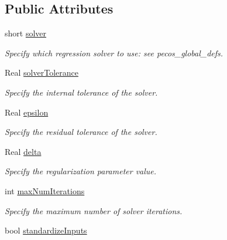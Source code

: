 \subsection*{Public Attributes}
\begin{DoxyCompactItemize}
\item 
short \hyperlink{classPecos_1_1CompressedSensingOptions_a3df2a8fab282b8ceac58d1add07afb94}{solver}\label{classPecos_1_1CompressedSensingOptions_a3df2a8fab282b8ceac58d1add07afb94}

\begin{DoxyCompactList}\small\item\em Specify which regression solver to use\+: see pecos\+\_\+global\+\_\+defs. \end{DoxyCompactList}\item 
Real \hyperlink{classPecos_1_1CompressedSensingOptions_a1149f15b677e7a27b720a27b9c0ac5ec}{solver\+Tolerance}\label{classPecos_1_1CompressedSensingOptions_a1149f15b677e7a27b720a27b9c0ac5ec}

\begin{DoxyCompactList}\small\item\em Specify the internal tolerance of the solver. \end{DoxyCompactList}\item 
Real \hyperlink{classPecos_1_1CompressedSensingOptions_a7cd0383f653cbd5fa1542574a226f311}{epsilon}\label{classPecos_1_1CompressedSensingOptions_a7cd0383f653cbd5fa1542574a226f311}

\begin{DoxyCompactList}\small\item\em Specify the residual tolerance of the solver. \end{DoxyCompactList}\item 
Real \hyperlink{classPecos_1_1CompressedSensingOptions_a6e815cecfc8bf0ee83558d5bfd70c2d1}{delta}\label{classPecos_1_1CompressedSensingOptions_a6e815cecfc8bf0ee83558d5bfd70c2d1}

\begin{DoxyCompactList}\small\item\em Specify the regularization parameter value. \end{DoxyCompactList}\item 
int \hyperlink{classPecos_1_1CompressedSensingOptions_a85d28d944a2380ab6f6f0ec5ff01dbda}{max\+Num\+Iterations}\label{classPecos_1_1CompressedSensingOptions_a85d28d944a2380ab6f6f0ec5ff01dbda}

\begin{DoxyCompactList}\small\item\em Specify the maximum number of solver iterations. \end{DoxyCompactList}\item 
bool \hyperlink{classPecos_1_1CompressedSensingOptions_afd70c4df5fec2b0851b2b2534d63b852}{standardize\+Inputs}\label{classPecos_1_1CompressedSensingOptions_afd70c4df5fec2b0851b2b2534d63b852}


\end{DoxyCompactItemize}
